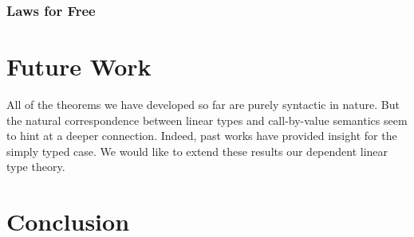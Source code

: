 \documentclass{article}
\begin{document}
  \subsubsection{Laws for Free}

  \section{Future Work}
  All of the theorems we have developed so far are purely syntactic in nature. But the natural correspondence between linear types and call-by-value semantics seem to hint at a deeper connection. Indeed, past works\cite{cbvsemantics} have provided insight for the simply typed case. We would like to extend these results our dependent linear type theory.

  \section{Conclusion}



\end{document}
